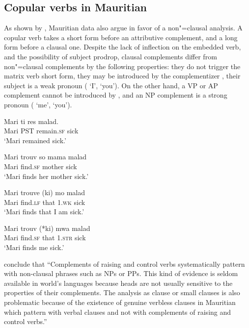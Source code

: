 \documentclass[output=paper
                ,modfonts
                ,nonflat
	        ,collection
	        ,collectionchapter
	        ,collectiontoclongg
 	        ,biblatex
                ,babelshorthands
                ,newtxmath
                ,draftmode
                ,colorlinks, citecolor=brown
]{./langsci/langscibook}
\begin{document}
\subsection{Copular verbs in Mauritian}

As shown by \citet{HenriandLaurens2011}, Mauritian data also argue in favor of a non"=clausal
analysis. A copular verb takes a short form before an attributive complement, and a long form before
a clausal one. Despite the lack of inflection on the embedded verb, and the possibility of subject
prodrop,  clausal complements differ from non"=clausal complements by the following properties: they
do not trigger the matrix verb short form, they may be introduced by the complementizer ,
their subject is a weak pronoun ( `I',  `you'). On the other hand, a VP or AP complement
cannot be introduced by , and an NP complement is a strong pronoun ( `me',
 `you').

\begin{exe}
\ex \begin{xlist}
\ex 
\gll Mari ti res  malad.\\
     Mari PST remain.\textsc{sf} sick\\\hfill\citep[]{HenriandLaurens2011}
\glt `Mari remained sick.'

\ex 
\gll Mari trouv  so mama malad\\
     Mari find.\textsc{sf} \POSS{} mother sick\\
\glt `Mari finds her mother sick.'

\ex 
\gll Mari trouve (ki) mo malad\\
     Mari find.\textsc{lf} that 1\SG.\textsc{wk} sick\\
\glt `Mari finds that I am sick.'

\ex 
\gll Mari trouv (*ki) mwa malad\\
     Mari find.\textsc{sf} that 1\SG.\textsc{str} sick\\
\glt `Mari finds me sick.'
\end{xlist}
\end{exe}

\citet[]{HenriandLaurens2011} conclude that ``Complements of raising and control verbs systematically pattern with non-clausal phrases such as NPs or PPs. This kind of evidence is seldom available in world's languages because heads are not usually sensitive to the properties of their complements. The analysis as clause or small clauses is also problematic because of the existence of genuine verbless clauses in Mauritian which pattern with verbal clauses and not with complements of raising and control verbs.''
\end{document}
